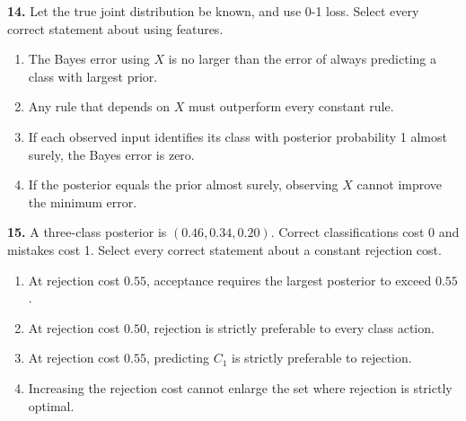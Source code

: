 \documentclass[11pt,a4paper]{article}
\begin{document}
\par\noindent\begin{minipage}{\linewidth}
\textbf{14.} Let the true joint distribution be known, and use 0-1 loss. Select every correct statement about using features.
\begin{enumerate}[label=(\Alph*),leftmargin=8mm,itemsep=2pt,topsep=2pt]
\item The Bayes error using \(X\) is no larger than the error of always predicting a class with largest prior.
\item Any rule that depends on \(X\) must outperform every constant rule.
\item If each observed input identifies its class with posterior probability 1 almost surely, the Bayes error is zero.
\item If the posterior equals the prior almost surely, observing \(X\) cannot improve the minimum error.
\end{enumerate}

\end{minipage}\par\vspace{3mm}
\par\noindent\begin{minipage}{\linewidth}
\textbf{15.} A three-class posterior is \((0.46,0.34,0.20)\). Correct classifications cost 0 and mistakes cost 1. Select every correct statement about a constant rejection cost.
\begin{enumerate}[label=(\Alph*),leftmargin=8mm,itemsep=2pt,topsep=2pt]
\item At rejection cost \(0.55\), acceptance requires the largest posterior to exceed \(0.55\).
\item At rejection cost \(0.50\), rejection is strictly preferable to every class action.
\item At rejection cost \(0.55\), predicting \(C_1\) is strictly preferable to rejection.
\item Increasing the rejection cost cannot enlarge the set where rejection is strictly optimal.
\end{enumerate}

\end{minipage}\par\vspace{3mm}
\end{document}
